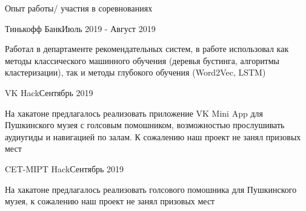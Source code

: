 \documentclass{resume} %
\begin{document}
\begin{rSection}{Опыт работы/ участия в соревнованиях}

\begin{rSubsection}{Тинькофф Банк}{Июль 2019 - Август 2019}{}{}
\item Работал в департаменте рекомендательных систем, в работе использовал как методы классического машинного обучения (деревья бустинга, алгоритмы кластеризации),  так и методы глубокого обучения (Word2Vec, LSTM)
\end{rSubsection}

\begin{rSubsection}{VK Hack}{Сентябрь 2019}{}{}
\item На хакатоне предлагалось реализовать приложение VK Mini App для Пушкинского музея с голсовым помошником, возможностью прослушивать аудиугиды и навигацией по залам. К сожалению наш проект не занял призовых мест 
\end{rSubsection}

\begin{rSubsection}{CET-MIPT Hack}{Сентябрь 2019}{}{}
\item На хакатоне предлагалось реализовать голсового помошника для Пушкинского музея, к сожалению наш проект не занял призовых мест 
\end{rSubsection}

\end{rSection}
\end{document}
